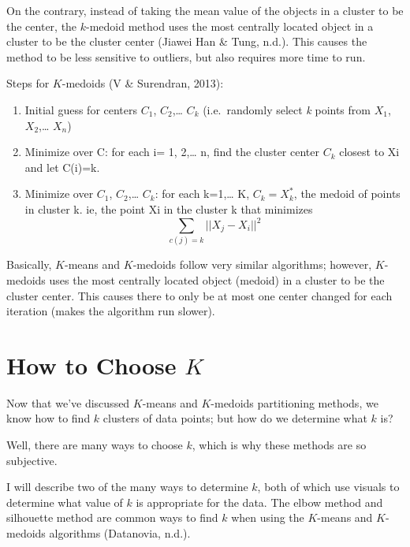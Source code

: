 \documentclass[12pt,twoside]{amherstthesis}
\begin{document}
  On the contrary, instead of taking the mean value of the objects in a
  cluster to be the center, the \(k\)-medoid method uses the most
  centrally located object in a cluster to be the cluster center (Jiawei
  Han \& Tung, n.d.). This causes the method to be less sensitive to
  outliers, but also requires more time to run.
  
  Steps for \(K\)-medoids (V \& Surendran, 2013):
  
  \begin{enumerate}
  \def\labelenumi{\arabic{enumi}.}
  \item
    Initial guess for centers \(C_1\), \(C_2\),\ldots{} \(C_k\)
    (i.e.~randomly select \emph{k} points from \(X_1\), \(X_2\),\ldots{}
    \(X_n\))
  \item
    Minimize over C: for each i= 1, 2,\ldots{} n, find the cluster center
    \(C_k\) closest to Xi and let C(i)=k.
  \item
    Minimize over \(C_1\), \(C_2\),\ldots{} \(C_k\): for each k=1,\ldots{}
    K, \(C_k = X_k^*\), the medoid of points in cluster k. ie, the point
    Xi in the cluster k that minimizes
    \[\sum  _{c(j)=k} ||{{X_j- X_i}}||^2\]
  \end{enumerate}
  
  Basically, \(K\)-means and \(K\)-medoids follow very similar algorithms;
  however, \(K\)-medoids uses the most centrally located object (medoid)
  in a cluster to be the cluster center. This causes there to only be at
  most one center changed for each iteration (makes the algorithm run
  slower).
  
  \section{\texorpdfstring{How to Choose
  \(K\)}{How to Choose K}}\label{how-to-choose-k}
  
  Now that we've discussed \(K\)-means and \(K\)-medoids partitioning
  methods, we know how to find \(k\) clusters of data points; but how do
  we determine what \(k\) is?
  
  Well, there are many ways to choose \(k\), which is why these methods
  are so subjective.
  
  I will describe two of the many ways to determine \(k\), both of which
  use visuals to determine what value of \(k\) is appropriate for the
  data. The elbow method and silhouette method are common ways to find
  \(k\) when using the \(K\)-means and \(K\)-medoids algorithms
  (Datanovia, n.d.).
  
\end{document}
